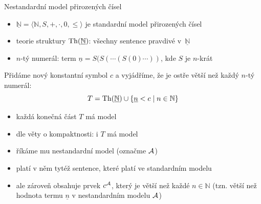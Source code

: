 \documentclass{beamer}
\begin{document}
\begin{frame}{Nestandardní model přirozených čísel}

    \pause
    \begin{itemize}
        \item $\underline{\mathbb N}=\langle\mathbb N,S,+,\cdot,0,\leq\rangle$ je \alert{standardní model} přirozených čísel\pause
        \item \alert{teorie struktury $\operatorname{Th}(\underline{\mathbb N})$:} všechny sentence \alert{pravdivé} v~$\underline{\mathbb N}$\pause
        \item \alert{$n$-tý numerál:} term $\underline n=S(S(\cdots (S(0)\cdots))$, kde $S$ je $n$-krát
    \end{itemize}
    
    \pause
    Přidáme nový konstantní symbol $c$ a vyjádříme, že je ostře větší než každý $n$-tý numerál:
    $$
    T=\operatorname{Th}(\underline{\mathbb N})\cup\{\underline n<c\mid n\in \mathbb N\}
    $$
        
    \pause
    \begin{itemize}
        \item každá konečná část $T$ má model\pause
        \item dle věty o kompaktnosti: i $T$ má model\pause
        \item říkáme mu \alert{nestandardní model} (označme $\mathcal{A}$)\pause
        \item platí v něm tytéž sentence, které platí ve standardním modelu\pause
        \item ale zároveň obsahuje prvek $c^{\mathcal{A}}$, který je větší než každé $n\in \mathbb N$ (tzn. větší než hodnota termu $\underline n$ v nestandardním modelu $\mathcal{A}$)
    \end{itemize}    

\end{frame}




\end{document}
